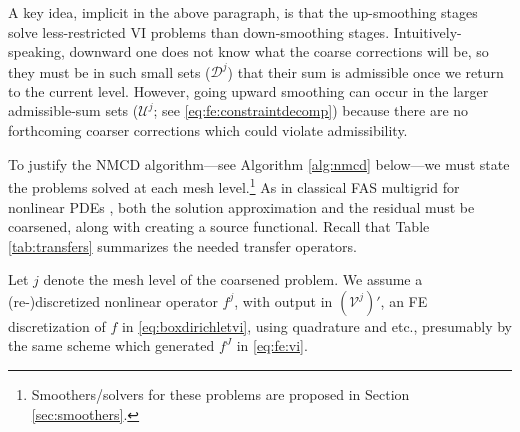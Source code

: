 \documentclass[letterpaper,final,12pt,reqno]{amsart}
\theoremstyle{cstyle}
\theoremstyle{cstyle*}
\theoremstyle{dstyle}
\numberwithin{equation}{section}
\numberwithin{figure}{section}
\numberwithin{table}{section}
\numberwithin{theorem}{section}
\newcommand{\cV}{\mathcal{V}}
\begin{document}
A key idea, implicit in the above paragraph, is that the up-smoothing stages solve less-restricted VI problems than down-smoothing stages.  Intuitively-speaking, downward one does not know what the coarse corrections will be, so they must be in such small sets ($\mathcal{D}^j$) that their sum is admissible once we return to the current level.  However, going upward smoothing can occur in the larger admissible-sum sets ($\mathcal{U}^j$; see \eqref{eq:fe:constraintdecomp}) because there are no forthcoming coarser corrections which could violate admissibility.

To justify the NMCD algorithm---see Algorithm \ref{alg:nmcd} below---we must state the problems solved at each mesh level.\footnote{Smoothers/solvers for these problems are proposed in Section \ref{sec:smoothers}.}  As in classical FAS multigrid for nonlinear PDEs \cite{BrandtLivne2011,Bruneetal2015,Trottenbergetal2001}, both the solution approximation and the residual must be coarsened, along with creating a source functional.  Recall that Table \ref{tab:transfers} summarizes the needed transfer operators.

Let $j$ denote the mesh level of the coarsened problem.  We assume a (re-)discretized nonlinear operator $f^j$, with output in $(\cV^j)'$, an FE discretization of $f$ in \eqref{eq:boxdirichletvi}, using quadrature and etc., presumably by the same scheme which generated $f^J$ in \eqref{eq:fe:vi}.
\end{document}
